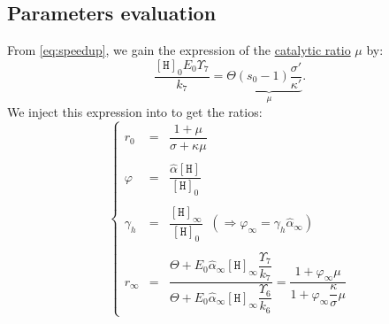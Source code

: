 \documentclass[aps,onecolumn,11pt]{revtex4}
\newcommand{\mychem}[1]{\mathtt{#1}}
\newcommand{\myconc}[1]{\left\lbrack{#1}\right\rbrack}
\newcommand{\spproton}{\mychem{H}}
\newcommand{\proton}{\myconc{\spproton}}
\begin{document}
\subsection{Parameters evaluation}
From \eqref{eq:speedup}, we gain the expression of the \underline{catalytic ratio} $\mu$ by:
\begin{equation}
\label{eq:mu_def}
	\dfrac{\proton_0 E_0 \Upsilon_7}{k_7} = \Theta \underbrace{\left(s_0-1\right) 
	\dfrac{ \sigma' }{\kappa'}}_{\mu}.
\end{equation}
We inject this expression into to get the ratios:
\begin{equation}
\left\lbrace
\begin{array}{rcl}
	r_0 & = & \dfrac{1+\mu}{\sigma+\kappa\mu}\\
	\\
	\varphi & = &   \dfrac{\hat\alpha \proton}{\proton_0}\\
	\\
	\gamma_h & = &  \dfrac{\proton_\infty}{\proton_0} \;\; \left(\Rightarrow \varphi_\infty = \gamma_h \hat\alpha_\infty\right)\\
	\\
	r_\infty & = &
	 \dfrac{\Theta + E_0 \hat\alpha_\infty \proton_\infty \dfrac{\Upsilon_7}{k_7} }
	 {\Theta + E_0 \hat\alpha_\infty \proton_\infty \dfrac{\Upsilon_6}{k_6}}
	 =\dfrac{1 + \varphi_\infty \mu }{1+ \varphi_\infty \dfrac{\kappa}{\sigma}\mu}
\end{array}
\right.
\end{equation}
\end{document}
